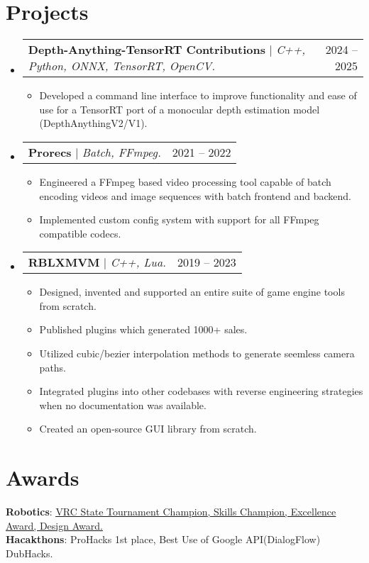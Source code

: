 \documentclass[letterpaper,11pt]{article}
\makeatletter
\newcommand{\resumeItem}[1]{
  \item\small{
    {#1 \vspace{-2pt}}
  }
}
\newcommand{\resumeProjectHeading}[2]{
    \item
    \begin{tabular*}{0.97\textwidth}{l@{\extracolsep{\fill}}r}
      \small#1 & #2 \\
    \end{tabular*}\vspace{-8pt}
}
\newcommand{\resumeSubHeadingListStart}{\begin{itemize}[leftmargin=0.15in, label={}]}
\newcommand{\resumeSubHeadingListEnd}{\end{itemize}}
\newcommand{\resumeItemListStart}{\begin{itemize}}
\newcommand{\resumeItemListEnd}{\end{itemize}\vspace{-5pt}}
\makeatother
\begin{document}
\section{Projects}
    \resumeSubHeadingListStart
      \resumeProjectHeading
        {\textbf{Depth-Anything-TensorRT Contributions} $|$ \emph{C++, Python, ONNX, TensorRT, OpenCV.}}{2024 -- 2025}
        \resumeItemListStart
          \resumeItem{Developed a command line interface to improve functionality and ease of use for a TensorRT port of a monocular depth estimation model (DepthAnythingV2/V1).}
        \resumeItemListEnd
      \resumeProjectHeading
          {\textbf{Prorecs} $|$ \emph{Batch, FFmpeg.}}{2021 -- 2022}
          \resumeItemListStart
            \resumeItem{Engineered a FFmpeg based video processing tool capable of batch encoding videos and image sequences with batch frontend and backend.}
            \resumeItem{Implemented custom config system with support for all FFmpeg compatible codecs.}
          \resumeItemListEnd
      \resumeProjectHeading
          {\textbf{RBLXMVM} $|$ \emph{C++, Lua.}}{2019 -- 2023}
          \resumeItemListStart
            \resumeItem{Designed, invented and supported an entire suite of game engine tools from scratch.}
            \resumeItem{Published plugins which generated 1000+ sales.}
            \resumeItem{Utilized cubic/bezier interpolation methods to generate seemless camera paths.}
            \resumeItem{Integrated plugins into other codebases with reverse engineering strategies when no documentation was available.}
            \resumeItem{Created an open-source GUI library from scratch.}
          \resumeItemListEnd
      
    \resumeSubHeadingListEnd

\section{Awards}
 \begin{itemize}[leftmargin=0.15in, label={}]
     \small{\item{
     \textbf{Robotics}{: \href{https://www.musd.org/district-news/milpitas-xtreme-robotics-team-wins-state-championship-advances-to-world-competition}{\underline{VRC State Tournament Champion, Skills Champion, Excellence Award, Design Award.}}} \\
     \textbf{Hacakthons}{: ProHacks 1st place, Best Use of Google API(DialogFlow) DubHacks.} \\
    }}
 \end{itemize}
\end{document}
